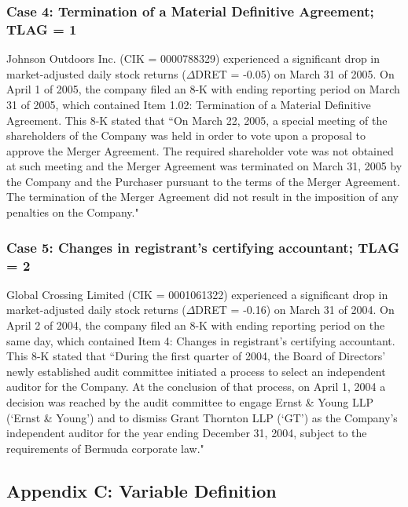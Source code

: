 \subsubsection*{Case 4: Termination of a Material Definitive Agreement; TLAG = 1}
Johnson Outdoors Inc. (CIK = 0000788329) experienced a significant drop in market-adjusted daily stock returns ($\Delta$DRET = -0.05) on March 31 of 2005. On April 1 of 2005, the company filed an 8-K with ending reporting period on March 31 of 2005, which contained Item 1.02: Termination of a Material Definitive Agreement. This 8-K stated that ``On March 22, 2005, a special meeting of the shareholders of the Company was held in order to vote upon a proposal to approve the Merger Agreement. The required shareholder vote was not obtained at such meeting and the Merger Agreement was terminated on March 31, 2005 by the Company and the Purchaser pursuant to the terms of the Merger Agreement. The termination of the Merger Agreement did not result in the imposition of any penalties on the Company."
\subsubsection*{Case 5: Changes in registrant's certifying accountant; TLAG = 2}
Global Crossing Limited (CIK = 0001061322) experienced a significant drop in market-adjusted daily stock returns ($\Delta$DRET = -0.16) on March 31 of 2004. On April 2 of 2004, the company filed an 8-K with ending reporting period on the same day, which contained Item 4: Changes in registrant's certifying accountant. This 8-K stated that ``During the first quarter of 2004, the Board of Directors’ newly established audit committee initiated a process to select an independent auditor for the Company. At the conclusion of that process, on April 1, 2004 a decision was reached by the audit committee to engage Ernst \& Young LLP (`Ernst \& Young') and to dismiss Grant Thornton LLP (`GT') as the Company’s independent auditor for the year ending December 31, 2004, subject to the requirements of Bermuda corporate law."

\newpage
\subsection*{Appendix C: Variable Definition}
\label{appc}
